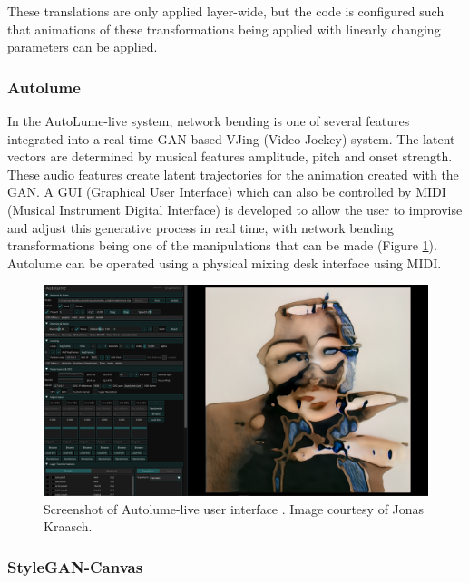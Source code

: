 These translations are only applied layer-wide, but the code is configured such that animations of these transformations being applied with linearly changing parameters can be applied. 

\subsubsection{Autolume}

In the AutoLume-live system, \citep{kraasch2022autolume,kraasch2023autolume} network bending is one of several features integrated into a real-time GAN-based VJing (Video Jockey) system. 
The latent vectors are determined by musical features amplitude, pitch and onset strength. 
These audio features create latent trajectories for the animation created with the GAN. 
A GUI (Graphical User Interface) which can also be controlled by MIDI (Musical Instrument Digital Interface) is developed to allow the user to improvise and adjust this generative process in real time, with network bending transformations being one of the manipulations that can be made (Figure \ref{fig:c7:autolume-live}). 
Autolume can be operated using a physical mixing desk interface using MIDI.

\begin{figure}[!htb]
    \centering
    \captionsetup{justification=centering}
    \includegraphics[width=1\textwidth]{figures/c7_impact/net-bend-technical/autolume-live.png}
    \caption[Autolume-live user interface]{Screenshot of Autolume-live user interface \citep{kraasch2023autolume}. Image courtesy of Jonas Kraasch.}
    \label{fig:c7:autolume-live}
\end{figure}

\subsubsection{StyleGAN-Canvas}

